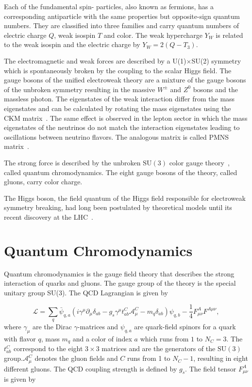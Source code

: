 Each of the fundamental spin- particles, also known as fermions, has
a corresponding antiparticle with the same properties but opposite-sign quantum
numbers. They are classified into three families and carry quantum numbers of
electric charge $Q$, weak isospin $T$ and color. The weak hypercharge $Y_W$ is
related to the weak isospin and the electric charge by $Y_W = 2(Q-T_3)$.

The electromagnetic and weak forces are described by a U(1)$\times$SU(2)
symmetry which is spontaneously broken by the coupling to the scalar Higgs
field. The gauge bosons of the unified electroweak theory are a mixture of the
gauge bosons of the unbroken symmetry resulting in the massive $W^\pm$ and $Z^0$
bosons and the massless photon. The eigenstates of the weak interaction differ
from the mass eigenstates and can be calculated by rotating the mass eigenstates
using the CKM matrix~\cite{Cabibbo:1963yz,Kobayashi:1973fv}. The same effect is
observed in the lepton sector in which the mass eigenstates of the neutrinos do
not match the interaction eigenstates leading to oscillations between neutrino
flavors.  The analogous matrix is called PMNS
matrix~\cite{Maki:1962mu,Pontecorvo:1957qd}.

The strong force is described by the unbroken $\mathrm{SU}(3)$ color gauge
theory~\cite{Zweig:1981pd,Fritzsch:1973pi}, called quantum chromodynamics. The
eight gauge bosons of the theory, called gluons, carry color charge. 

The Higgs boson, the field quantum of the Higgs field responsible for
electroweak symmetry breaking, had long been postulated by theoretical models
until its recent discovery at the LHC~\cite{Chatrchyan:2012xdj,Aad:2012tfa}.

\section{Quantum Chromodynamics}

Quantum chromodynamics is the gauge field theory that describes the
strong interaction of quarks and gluons. The gauge group of the theory is the
special unitary group SU(3). The QCD Lagrangian is given by

\begin{equation*}
   \mathcal{L} = \sum_q \bar \psi_{q,a} \left( i \gamma^\mu \partial_\mu
   \delta_{ab} - g_s \gamma^\mu t_{ab}^C \mathcal{A}_{\mu}^C - m_q \delta_{ab}
   \right) \psi_{q,b} - \frac{1}{4} F_{\mu\nu}^{A} F^{A \mu\nu},
\end{equation*}
%
where $\gamma_\mu$ are the Dirac $\gamma$-matrices and $\psi_{q,a}$ are quark-field
spinors for a quark with flavor $q$, mass $m_q$ and a color of index $a$
which runs from $1$ to $N_C=3$. The $t_{ab}^C$ correspond to the eight
$3\times3$ matrices and are the generators of the $\mathrm{SU}(3)$
group.$\mathcal{A}_\mu^C$ denotes the gluon fields and $C$ runs from 1 to
$N_C-1$, resulting in eight different gluons. The QCD coupling strength is defined
by $g_s$. The field tensor $F_{\mu\nu}^A$ is given by

